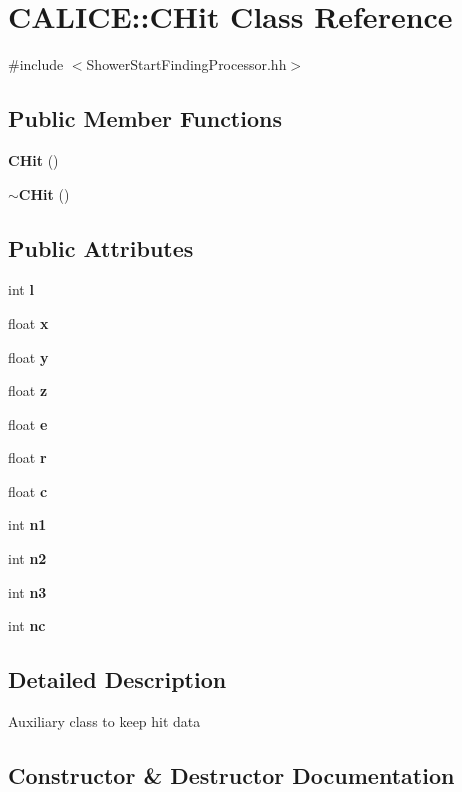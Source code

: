 \section{C\-A\-L\-I\-C\-E\-:\-:C\-Hit Class Reference}
\label{classCALICE_1_1CHit}


{\ttfamily \#include $<$Shower\-Start\-Finding\-Processor.\-hh$>$}

\subsection*{Public Member Functions}
\begin{DoxyCompactItemize}
\item 
{\bf C\-Hit} ()
\item 
{\bf $\sim$\-C\-Hit} ()
\end{DoxyCompactItemize}
\subsection*{Public Attributes}
\begin{DoxyCompactItemize}
\item 
int {\bfseries l}\label{classCALICE_1_1CHit_ae0fd15bed570010ba641d99302254a8c}

\item 
float {\bf x}
\item 
float {\bf y}
\item 
float {\bf z}
\item 
float {\bf e}
\item 
float {\bf r}
\item 
float {\bf c}
\item 
int {\bf n1}
\item 
int {\bf n2}
\item 
int {\bf n3}
\item 
int {\bf nc}
\end{DoxyCompactItemize}


\subsection{Detailed Description}
Auxiliary class to keep hit data 

\subsection{Constructor \& Destructor Documentation}
